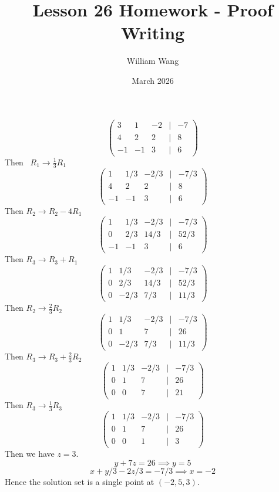 \documentclass{article}
\title{Lesson 26 Homework - Proof Writing}
\author{William Wang}
\date{March 2026}
\begin{document}
\maketitle

\section{}
\subsection{}
\[\begin{pmatrix}
    3&1&-2&|&-7 \\ 4&2&2&|&8 \\ -1&-1&3&|&6
\end{pmatrix}\]
Then \
\(R_1 \rightarrow \frac{1}{3}R_1\)
\[\begin{pmatrix}
    1&1/3&-2/3&|&-7/3 \\ 4&2&2&|&8 \\ -1&-1&3&|&6
\end{pmatrix}\]
Then \(R_2 \rightarrow  R_2 - 4R_1\)
\[\begin{pmatrix}
    1&1/3&-2/3&|&-7/3 \\ 0&2/3&14/3&|&52/3 \\ -1&-1&3&|&6
\end{pmatrix}\]
Then \(R_3 \rightarrow R_3 + R_1\)
\[\begin{pmatrix}
    1&1/3&-2/3&|&-7/3 \\ 0&2/3&14/3&|&52/3 \\ 0&-2/3&7/3&|&11/3
\end{pmatrix}\]
Then \(R_2 \rightarrow \frac{2}{3}R_2\)
\[\begin{pmatrix}
    1&1/3&-2/3&|&-7/3 \\ 0&1&7&|&26 \\ 0&-2/3&7/3&|&11/3
\end{pmatrix}\]
Then \(R_3 \rightarrow R_3 + \frac{2}{3}R_2\)
\[\begin{pmatrix}
    1&1/3&-2/3&|&-7/3 \\ 0&1&7&|&26 \\ 0&0&7&|&21
\end{pmatrix}\]
Then \(R_3 \rightarrow \frac{1}{3}R_3\)
\[\begin{pmatrix}
    1&1/3&-2/3&|&-7/3 \\ 0&1&7&|&26 \\ 0&0&1&|&3
\end{pmatrix}\]
Then we have \(z = 3\). 
\[y+7z = 26 \implies y = 5\]
\[x + y/3 -2z/3 = -7/3 \implies x = -2\]
Hence the solution set is a single point at \((-2,5,3)\). 
\end{document}
